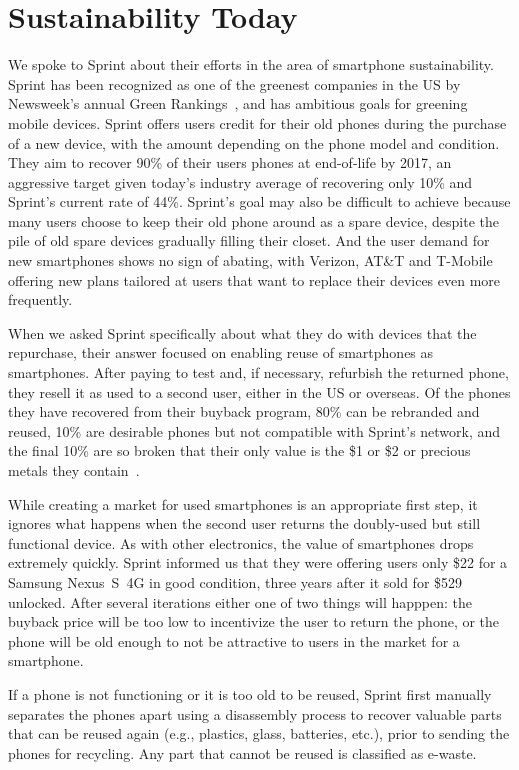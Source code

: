 \section{Sustainability Today}
\label{sec-sustainability}

We spoke to Sprint about their efforts in the area of smartphone
sustainability. Sprint has been recognized as one of the greenest companies
in the US by Newsweek's annual Green Rankings~\cite{sprintgreen-url}, and has
ambitious goals for greening mobile devices. Sprint offers users credit for
their old phones during the purchase of a new device, with the amount
depending on the phone model and condition. They aim to recover 90\% of their
users phones at end-of-life by 2017, an aggressive target given today's
industry average of recovering only 10\% and Sprint's current rate of 44\%.
Sprint's goal may also be difficult to achieve because many users choose to
keep their old phone around as a spare device, despite the pile of old spare
devices gradually filling their closet. And the user demand for new
smartphones shows no sign of abating, with Verizon, AT\&T and T-Mobile
offering new plans tailored at users that want to replace their devices even
more frequently.

When we asked Sprint specifically about what they do with devices that the
repurchase, their answer focused on enabling reuse of smartphones as
smartphones. After paying to test and, if necessary, refurbish the returned
phone, they resell it as used to a second user, either in the US or overseas.
Of the phones they have recovered from their buyback program, 80\% can be
rebranded and reused, 10\% are desirable phones but not compatible with
Sprint's network, and the final 10\% are so broken that their only value is
the \$1 or \$2 or precious metals they contain~\cite{FIXME-goldinphone}.

While creating a market for used smartphones is an appropriate first step, it
ignores what happens when the second user returns the doubly-used but still
functional device. As with other electronics, the value of smartphones drops
extremely quickly. Sprint informed us that they were offering users only \$22
for a Samsung Nexus~S~4G in good condition, three years after it sold for
\$529 unlocked. After several iterations either one of two things will
happpen: the buyback price will be too low to incentivize the user to return
the phone, or the phone will be old enough to not be attractive to users in
the market for a smartphone.

If a phone is not functioning or it is too old to be reused, Sprint first manually separates the phones apart using a disassembly process to recover valuable parts that can be reused again (e.g.,  plastics, glass, batteries, etc.), prior to sending the phones for recycling. Any part that cannot be reused is classified as e-waste.

